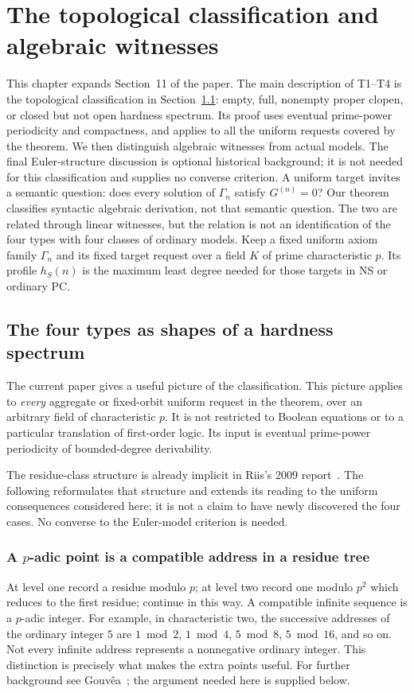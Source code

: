 \chapter{The topological classification and algebraic witnesses}
\label{tx:sec:model-theory}
This chapter expands Section~11 of the paper. The main description of
T1--T4 is the topological classification in
Section~\ref{tx:sec:topological-spectrum}: empty, full, nonempty proper
clopen, or closed but not open hardness spectrum. Its proof uses eventual
prime-power periodicity and compactness, and applies to all the uniform
requests covered by the theorem.
We then distinguish algebraic witnesses from actual models. The final
Euler-structure discussion is optional historical background; it is
not needed for this classification and supplies no converse criterion.
A uniform target invites a semantic question: does every solution of
$\Gamma_n$ satisfy $G^{(n)}=0$? Our theorem classifies syntactic algebraic
derivation, not that semantic question. The two are related through
linear witnesses, but the relation is not an identification of the four
types with four classes of ordinary models.
Keep a fixed uniform axiom family $\Gamma_n$ and its fixed target request
over a field $K$ of prime characteristic $p$. Its profile $h_S(n)$ is
the maximum least degree needed for those targets in NS or ordinary PC.

\section{The four types as shapes of a hardness spectrum}
\label{tx:sec:topological-spectrum}
The current paper gives a useful picture of the classification. This
picture applies to \emph{every} aggregate or fixed-orbit uniform request
in the theorem, over an arbitrary field of characteristic $p$. It is
not restricted to Boolean equations or to a particular translation of
first-order logic. Its input is eventual prime-power periodicity of
bounded-degree derivability.

The residue-class structure is already implicit in Riis's 2009
report~\cite[Section~4, pp.~18--19]{RiisLong}. The following reformulates
that structure and extends its reading to the uniform consequences
considered here; it is not a claim to have newly discovered the four
cases. No converse to the Euler-model criterion is needed.

\subsection{A \texorpdfstring{$p$}{p}-adic point is a compatible address in a residue tree}
At level one record a residue modulo $p$; at level two record one modulo
$p^2$ which reduces to the first residue; continue in this way. A
compatible infinite sequence is a $p$-adic integer. For example, in
characteristic two, the successive addresses of the ordinary integer
$5$ are $1\bmod2$, $1\bmod4$, $5\bmod8$, $5\bmod16$, and so on.
Not every infinite address represents a nonnegative ordinary integer.
This distinction is precisely what makes the extra points useful.
For further background see Gouv\^ea~\cite{Gouvea}; the argument
needed here is supplied below.

